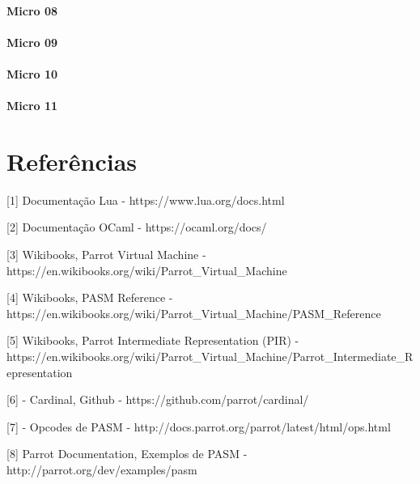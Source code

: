 \documentclass[12pt,a4paper,twoside]{report}
\begin{document}
\subsubsection{Micro 08}


\subsubsection{Micro 09}


\subsubsection{Micro 10}


\subsubsection{Micro 11}




\chapter{Referências}
[1] Documentação Lua - https://www.lua.org/docs.html

[2] Documentação OCaml - https://ocaml.org/docs/

[3] Wikibooks, Parrot Virtual Machine - https://en.wikibooks.org/wiki/Parrot_Virtual_Machine

[4] Wikibooks, PASM Reference - https://en.wikibooks.org/wiki/Parrot_Virtual_Machine/PASM_Reference

[5] Wikibooks, Parrot Intermediate Representation (PIR) - https://en.wikibooks.org/wiki/Parrot_Virtual_Machine/Parrot_Intermediate_Representation

[6] - Cardinal, Github - https://github.com/parrot/cardinal/

[7] - Opcodes de PASM - http://docs.parrot.org/parrot/latest/html/ops.html

[8] Parrot Documentation, Exemplos de PASM - http://parrot.org/dev/examples/pasm

\clearpage
{}
\appendix
\end{document}
